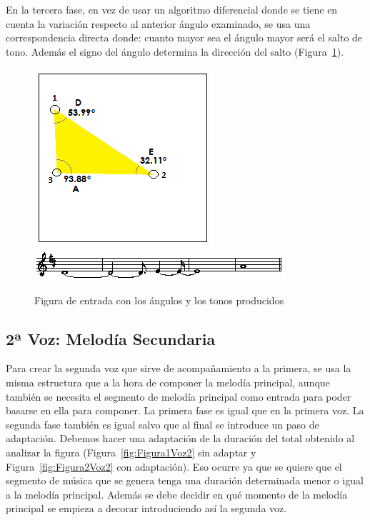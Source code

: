 En la tercera fase, en vez de usar un algoritmo diferencial donde se tiene en cuenta la variación respecto al anterior ángulo examinado, se usa una correspondencia directa donde: cuanto mayor sea el ángulo mayor será el salto de tono. Además el signo del ángulo determina la dirección del salto (Figura~\ref{fig:Figura6Voz1}).

		\begin{figure}[htbp]
		\centering
		\hspace*{0.0in}
		\includegraphics[scale=1]{graphics/simpletest1-F3_2.png}
		\includegraphics[scale=1]{graphics/simpletest1_2-MELpartitura.png}
		\caption{Figura de entrada con los ángulos y los tonos producidos}
		\label{fig:Figura6Voz1}
		\end{figure}


\subsection{2ª Voz: Melodía Secundaria}

Para crear la segunda voz que sirve de acompañamiento a la primera, se usa la misma estructura que a la hora de componer la melodía principal, aunque también se necesita el segmento de melodía principal como entrada para poder basarse en ella para componer. 
La primera fase es igual que en la primera voz. La segunda fase también es igual salvo que al final se introduce un paso de adaptación. Debemos hacer una adaptación de la duración del total obtenido al analizar la figura (Figura~\ref{fig:Figura1Voz2} sin adaptar y Figura~\ref{fig:Figura2Voz2} con adaptación). Eso ocurre ya que se quiere que el segmento de música que se genera tenga una duración determinada menor o igual a la melodía principal. Además se debe decidir en qué momento de la melodía principal se empieza a decorar introduciendo así la segunda voz.

